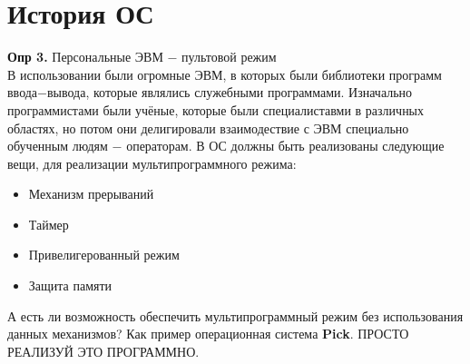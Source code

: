\documentclass[a4paper, 12pt, titlepage, finall]{extreport}
\begin{document}
        \section{История ОС}
            \textbf{Опр 3.} Персональные ЭВМ $-$ пультовой режим\\
            В использовании были огромные ЭВМ, в которых были библиотеки программ ввода$-$вывода, которые являлись служебными программами.
            Изначально программистами были учёные, которые были специалиставми в различных областях, но потом они делигировали
            взаимодествие с ЭВМ специально обученным людям $-$ операторам.
            В ОС должны быть реализованы следующие вещи, для реализации мультипрограммного режима:
            \begin{itemize}
                \item Механизм прерываний
                \item Таймер
                \item Привелигерованный режим
                \item Защита памяти
            \end{itemize}
            А есть ли возможность обеспечить мультипрограммный режим без использования данных механизмов?
            Как пример операционная система \textbf{Pick}. ПРОСТО РЕАЛИЗУЙ ЭТО ПРОГРАММНО.
\end{document}
